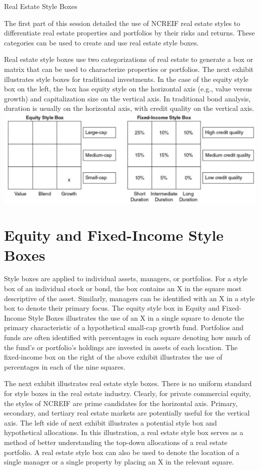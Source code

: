 \documentclass[11pt]{article}
\begin{document}
Real Estate Style Boxes

The first part of this session detailed the use of NCREIF real estate styles to differentiate real estate properties and portfolios by their risks and returns. These categories can be used to create and use real estate style boxes.

Real estate style boxes use two categorizations of real estate to generate a box or matrix that can be used to characterize properties or portfolios. The next exhibit illustrates style boxes for traditional investments. In the case of the equity style box on the left, the box has equity style on the horizontal axis (e.g., value versus growth) and capitalization size on the vertical axis. In traditional bond analysis, duration is usually on the horizontal axis, with credit quality on the vertical axis.\\
\includegraphics[max width=\textwidth, center]{2024_04_11_515942530f610ac594f4g-2(1)}

\section*{Equity and Fixed-Income Style Boxes}
Style boxes are applied to individual assets, managers, or portfolios. For a style box of an individual stock or bond, the box contains an X in the square most descriptive of the asset. Similarly, managers can be identified with an X in a style box to denote their primary focus. The equity style box in Equity and Fixed-Income Style Boxes illustrates the use of an $\mathrm{X}$ in a single square to denote the primary characteristic of a hypothetical small-cap growth fund. Portfolios and funds are often identified with percentages in each square denoting how much of the fund's or portfolio's holdings are invested in assets of each location. The fixed-income box on the right of the above exhibit illustrates the use of percentages in each of the nine squares.

The next exhibit illustrates real estate style boxes. There is no uniform standard for style boxes in the real estate industry. Clearly, for private commercial equity, the styles of NCREIF are prime candidates for the horizontal axis. Primary, secondary, and tertiary real estate markets are potentially useful for the vertical axis. The left side of next exhibit illustrates a potential style box and hypothetical allocations. In this illustration, a real estate style box serves as a method of better understanding the top-down allocations of a real estate portfolio. A real estate style box can also be used to denote the location of a single manager or a single property by placing an $\mathrm{X}$ in the relevant square.
\end{document}
